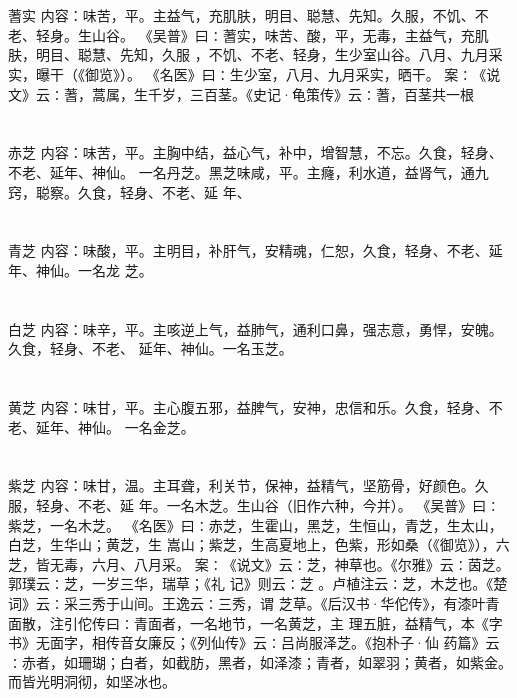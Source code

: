 \documentclass[12pt,UTF8]{ctexbook}
\begin{document}
\chapter{}蓍实
内容：味苦，平。主益气，充肌肤，明目、聪慧、先知。久服，不饥、不老、轻身。生山谷。 
《吴普》曰∶蓍实，味苦、酸，平，无毒，主益气，充肌肤，明目、聪慧、先知，久服 
，不饥、不老、轻身，生少室山谷。八月、九月采实，曝干（《御览》）。 
《名医》曰∶生少室，八月、九月采实，晒干。 
案∶《说文》云∶蓍，蒿属，生千岁，三百茎。《史记·龟策传》云∶蓍，百茎共一根 


\chapter{}赤芝
内容：味苦，平。主胸中结，益心气，补中，增智慧，不忘。久食，轻身、不老、延年、神仙。 
一名丹芝。黑芝味咸，平。主癃，利水道，益肾气，通九窍，聪察。久食，轻身、不老、延 
年、 


\chapter{}青芝
内容：味酸，平。主明目，补肝气，安精魂，仁恕，久食，轻身、不老、延年、神仙。一名龙 
芝。 


\chapter{}白芝
内容：味辛，平。主咳逆上气，益肺气，通利口鼻，强志意，勇悍，安魄。久食，轻身、不老、 
延年、神仙。一名玉芝。 


\chapter{}黄芝
内容：味甘，平。主心腹五邪，益脾气，安神，忠信和乐。久食，轻身、不老、延年、神仙。 
一名金芝。 


\chapter{}紫芝
内容：味甘，温。主耳聋，利关节，保神，益精气，坚筋骨，好颜色。久服，轻身、不老、延 
年。一名木芝。生山谷（旧作六种，今并）。 
《吴普》曰∶紫芝，一名木芝。 
《名医》曰∶赤芝，生霍山，黑芝，生恒山，青芝，生太山，白芝，生华山；黄芝，生 
嵩山；紫芝，生高夏地上，色紫，形如桑（《御览》），六芝，皆无毒，六月、八月采。 
案∶《说文》云∶芝，神草也。《尔雅》云∶茵芝。郭璞云∶芝，一岁三华，瑞草；《礼 
记》则云∶芝 。卢植注云∶芝，木芝也。《楚词》云∶采三秀于山间。王逸云∶三秀，谓 
芝草。《后汉书·华佗传》，有漆叶青面散，注引佗传曰∶青面者，一名地节，一名黄芝，主 
理五脏，益精气，本《字书》无面字，相传音女廉反；《列仙传》云∶吕尚服泽芝。《抱朴子·仙 
药篇》云∶赤者，如珊瑚；白者，如截肪，黑者，如泽漆；青者，如翠羽；黄者，如紫金。 
而皆光明洞彻，如坚冰也。 
\end{document}
